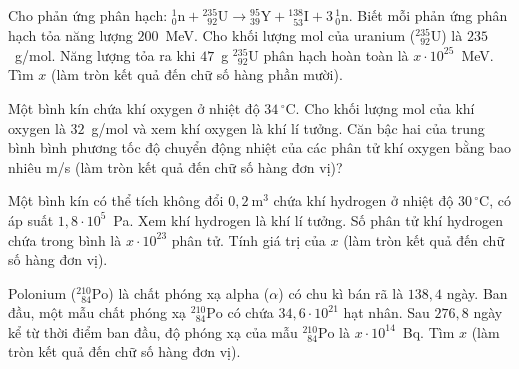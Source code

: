 	\begin{ex}%
		Cho phản ứng phân hạch: ${}^1_0\text{n}+{}^{235}_{\phantom{2}92}\text{U}\to{}^{95}_{39}\text{Y}+{}^{138}_{\phantom{1}53}\text{I}+3\,{}^1_0\text{n}$. Biết mỗi phản ứng phân hạch tỏa năng lượng $200$~MeV. Cho khối lượng mol của uranium ($^{235}_{\phantom{2}92}\text{U}$) là $235$~g/mol. Năng lượng tỏa ra khi $47$~g $^{235}_{\phantom{2}92}\text{U}$ phân hạch hoàn toàn là $x\cdot 10^{25}$~MeV. Tìm $x$ (làm tròn kết quả đến chữ số hàng phần mười).
		\par
	\end{ex}

	\begin{ex}%
		Một bình kín chứa khí oxygen ở nhiệt độ $34\,^\circ\text{C}$. Cho khối lượng mol của khí oxygen là $32$~g/mol và xem khí oxygen là khí lí tưởng. Căn bậc hai của trung bình bình phương tốc độ chuyển động nhiệt của các phân tử khí oxygen bằng bao nhiêu m/s (làm tròn kết quả đến chữ số hàng đơn vị)?
		\par
	\end{ex}

	\begin{ex}%
		Một bình kín có thể tích không đổi $0{,}2~\text{m}^3$ chứa khí hydrogen ở nhiệt độ $30\,^\circ\text{C}$, có áp suất $1{,}8\cdot 10^5$~Pa. Xem khí hydrogen là khí lí tưởng. Số phân tử khí hydrogen chứa trong bình là $x\cdot 10^{23}$ phân tử. Tính giá trị của $x$ (làm tròn kết quả đến chữ số hàng đơn vị).
		\par
	\end{ex}

	\begin{ex}%
		Polonium ($^{210}_{\phantom{2}84}\text{Po}$) là chất phóng xạ alpha ($\alpha$) có chu kì bán rã là $138{,}4$ ngày. Ban đầu, một mẫu chất phóng xạ $^{210}_{\phantom{2}84}\text{Po}$ có chứa $34{,}6\cdot 10^{21}$ hạt nhân. Sau $276{,}8$ ngày kể từ thời điểm ban đầu, độ phóng xạ của mẫu $^{210}_{\phantom{2}84}\text{Po}$ là $x\cdot 10^{14}$~Bq. Tìm $x$ (làm tròn kết quả đến chữ số hàng đơn vị).
		\par
	\end{ex}

